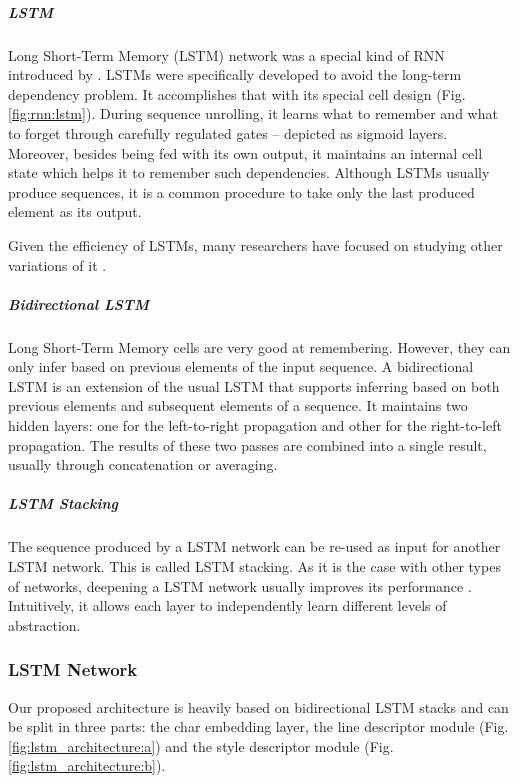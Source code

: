 \subparagraph*{LSTM} 
Long Short-Term Memory (LSTM) network was a special kind of RNN introduced by . LSTMs were specifically developed to avoid the long-term dependency problem. It accomplishes that with its special cell design (Fig. \ref{fig:rnn:lstm}). During sequence unrolling, it learns what to remember and what to forget through carefully regulated gates -- depicted as sigmoid layers. Moreover, besides being fed with its own output, it maintains an internal cell state which helps it to remember such dependencies. Although LSTMs usually produce sequences, it is a common procedure to take only the last produced element as its output.

Given the efficiency of LSTMs, many researchers have focused on studying other variations of it \cite{lstm_odyssey}.

\subparagraph*{Bidirectional LSTM} Long Short-Term Memory cells are very good at remembering. However, they can only infer based on previous elements of the input sequence. A bidirectional LSTM \cite{bi_lstm} is an extension of the usual LSTM that supports inferring based on both previous elements and subsequent elements of a sequence. It maintains two hidden layers: one for the left-to-right propagation and other for the right-to-left propagation. The results of these two passes are combined into a single result, usually through concatenation or averaging.

\subparagraph*{LSTM Stacking} The sequence produced by a LSTM network can be re-used as input for another LSTM network. This is called LSTM stacking. As it is the case with other types of networks, deepening a LSTM network usually improves its performance \cite{deep_lstm}. Intuitively, it allows each layer to independently learn different levels of abstraction.

\subsubsection{LSTM Network}\label{sec:models:lstm}

Our proposed architecture is heavily based on bidirectional LSTM stacks and can be split in three parts: the char embedding layer, the line descriptor module (Fig. \ref{fig:lstm_architecture:a}) and the style descriptor module (Fig. \ref{fig:lstm_architecture:b}).

